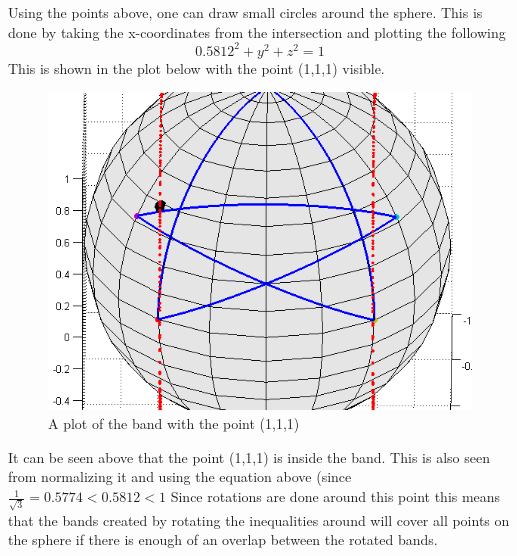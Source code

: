 \documentclass[
  utf8,%
  parskip,%
  largesmallcaps,intlimits,widermath,%
  sharecounter,nobreak,definition=marks,%
  noparts%
]{rtthesis}
\begin{document}
Using the points above, one can draw small circles around the sphere. This is done by taking the x-coordinates from the intersection and plotting the following 
\begin{equation}
0.5812^2+y^2+z^2=1
\end{equation}
This is shown in the plot below with the point (1,1,1) visible.
\begin{figure}[H]
\begin{center}
\includegraphics[scale=0.5]{completeband111big.png}
\caption{A plot of the band with the point (1,1,1)}
\label{fig:completeband}
\end{center}
\end{figure}
It can be seen above that the point (1,1,1) is inside the band. This is also seen from normalizing it and using the equation above (since $\frac{1}{\sqrt{3}}=0.5774<0.5812<1$
Since rotations are done around this point this means that the bands created by rotating the inequalities around will cover all points on the sphere if there is enough of an overlap between the rotated bands. 
\end{document}
